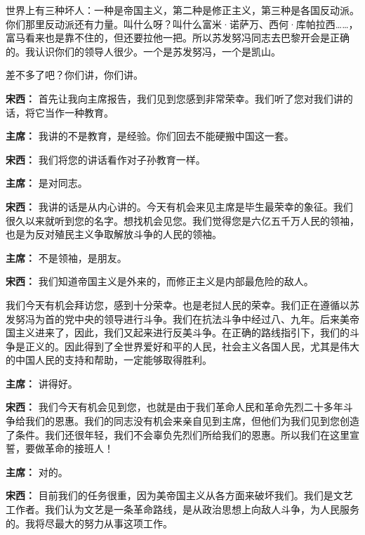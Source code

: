 \begin{list}{}
世界上有三种坏人：一种是帝国主义，第二种是修正主义，第三种是各国反动派。你们那里反动派还有力量。叫什么呀？叫什么富米·诺萨万、西何·库帕拉西……，富马看来也是靠不住的，但还要拉他一把。所以苏发努冯同志去巴黎开会是正确的。我认识你们的领导人很少。一个是苏发努冯，一个是凯山。

差不多了吧？你们讲，你们讲。

\item[\textbf{宋西：}] 首先让我向主席报告，我们见到您感到非常荣幸。我们听了您对我们讲的话，将它当作一种教育。

\item[\textbf{主席：}] 我讲的不是教育，是经验。你们回去不能硬搬中国这一套。

\item[\textbf{宋西：}] 我们将您的讲话看作对子孙教育一样。

\item[\textbf{主席：}] 是对同志。

\item[\textbf{宋西：}] 我讲的话是从内心讲的。今天有机会来见主席是毕生最荣幸的象征。我们很久以来就听到您的名字。想找机会见您。我们觉得您是六亿五千万人民的领袖，也是为反对殖民主义争取解放斗争的人民的领袖。

\item[\textbf{主席：}] 不是领袖，是朋友。

\item[\textbf{宋西：}] 我们知道帝国主义是外来的，而修正主义是内部最危险的敌人。

我们今天有机会拜访您，感到十分荣幸。也是老挝人民的荣幸。我们正在遵循以苏发努冯为首的党中央的领导进行斗争。我们在抗法斗争中经过八、九年。后来美帝国主义进来了，因此，我们又起来进行反美斗争。在正确的路线指引下，我们的斗争是正义的。因此得到了全世界爱好和平的人民，社会主义各国人民，尤其是伟大的中国人民的支持和帮助，一定能够取得胜利。

\item[\textbf{主席：}] 讲得好。

\item[\textbf{宋西：}] 我们今天有机会见到您，也就是由于我们革命人民和革命先烈二十多年斗争给我们的恩惠。我们的同志没有机会来亲自见到主席，但他们为我们见到您创造了条件。我们还很年轻，我们不会辜负先烈们所给我们的恩惠。所以我们在这里宣誓，要做革命的接班人！

\item[\textbf{主席：}] 对的。

\item[\textbf{宋西：}] 目前我们的任务很重，因为美帝国主义从各方面来破坏我们。我们是文艺工作者。我们认为文艺是一条革命路线，是从政治思想上向敌人斗争，为人民服务的。我将尽最大的努力从事这项工作。


\end{list}
